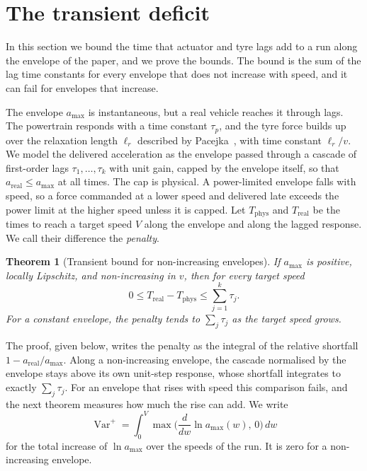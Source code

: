 \documentclass[12pt, twoside]{amsart}
\newtheorem{theorem}{Theorem}[section]
\theoremstyle{definition}
\newcommand{\amax}{a_{\max}}
\begin{document}
\clearpage
\section{The transient deficit}\label{supp:transient}

In this section we bound the time that actuator and tyre lags add to a run along the envelope of the
paper, and we prove the bounds. The
bound is the sum of the lag time constants for every envelope that does not increase with speed, and
it can fail for envelopes that increase.

The envelope $\amax$ is instantaneous, but a real vehicle reaches it through lags. The powertrain
responds with a time constant $\tau_p$, and the tyre force builds up over the relaxation length
$\ell_r$ described by Pacejka~\cite{Pacejka2012}, with time constant $\ell_r/v$. We model the
delivered acceleration as the envelope passed through a cascade of first-order lags
$\tau_1,\dots,\tau_k$ with unit gain, capped by the envelope itself, so that
$a_{\mathrm{real}}\le\amax$ at all times. The cap is physical. A power-limited envelope falls with
speed, so a force commanded at a lower speed and delivered late exceeds the power limit at the
higher speed unless it is capped. Let $T_{\mathrm{phys}}$ and $T_{\mathrm{real}}$ be the times to reach a
target speed $V$ along the envelope and along the lagged response. We call their difference the
\emph{penalty}.

\begin{theorem}[Transient bound for non-increasing envelopes]\label{thm:transientbound}
If $\amax$ is positive, locally Lipschitz, and non-increasing in $v$, then for every target speed
\[
0\le T_{\mathrm{real}}-T_{\mathrm{phys}}\le\sum_{j=1}^k\tau_j .
\]
For a constant envelope, the penalty tends to $\sum_j\tau_j$ as the target speed grows.
\end{theorem}

The proof, given below, writes the penalty as
the integral of the relative shortfall $1-a_{\mathrm{real}}/\amax$. Along a non-increasing envelope,
the cascade normalised by the envelope stays above its own unit-step response, whose shortfall
integrates to exactly $\sum_j\tau_j$. For an envelope that rises with speed this comparison fails,
and the next theorem measures how much the rise can add. We write
\[
\operatorname{Var}^+=\int_0^V\max\Big(\frac{d}{dw}\ln\amax(w),\,0\Big)\,dw
\]
for the total increase of $\ln\amax$ over the speeds of the run. It is zero for a non-increasing
envelope.
\end{document}
